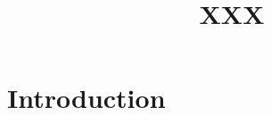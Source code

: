 \documentclass[draft,12pt,letterpaper]{article}
\title{XXX}
\author{\Us}
\begin{document}
\maketitle

\begin{abstract}
    
\end{abstract}

\section{Introduction}
\label{sec:intro}

\end{document}
